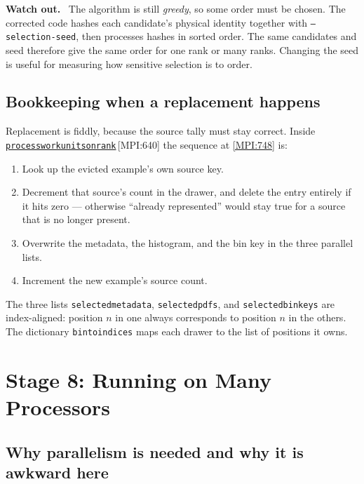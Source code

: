 \documentclass[11pt,a4paper]{report}
\newcommand{\srcbase}{vscode://file/Users/syellapa/Documents/Research/2026/ANSYS/Multi-ScalarPDF}
\newcommand{\srctag}[1]{{\footnotesize\textcolor{TagGray}{[#1]}}}
\newcommand{\Mpi}[2]{\href{\srcbase/EnsightPDFHybridDatasetMPI.py:#1}{\texttt{#2}}\,\srctag{MPI:#1}}
\newcommand{\MpiL}[1]{\href{\srcbase/EnsightPDFHybridDatasetMPI.py:#1}{\srctag{MPI:#1}}}
\newcommand{\code}[1]{\texttt{#1}}
\renewcommand{\_}{\origtextunderscore\allowbreak}
\newlength{\calloutwidth}
\newcommand{\calloutOpen}{%
  \par\medskip\noindent
  \setlength{\calloutwidth}{\dimexpr\linewidth-2\fboxsep\relax}%
  \begin{lrbox}{\calloutbox}\begin{minipage}{\calloutwidth}}
\newcommand{\calloutClose}[1]{%
  \end{minipage}\end{lrbox}\colorbox{#1}{\usebox{\calloutbox}}\par\medskip}
\newenvironment{caution}
  {\calloutOpen\textbf{Watch out.}\ }
  {\calloutClose{WarnBG}}
\begin{document}
\begin{caution}
The algorithm is still \emph{greedy}, so some order must be chosen.  The corrected code hashes
each candidate's physical identity together with \code{--selection-seed}, then processes hashes
in sorted order.  The same candidates and seed therefore give the same order for one rank or
many ranks.  Changing the seed is useful for measuring how sensitive selection is to order.
\end{caution}

\section{Bookkeeping when a replacement happens}

Replacement is fiddly, because the source tally must stay correct. Inside
\Mpi{640}{process\_work\_units\_on\_rank} the sequence at \MpiL{748} is:

\begin{enumerate}
  \item Look up the evicted example's own source key.
  \item Decrement that source's count in the drawer, and delete the entry entirely if it
        hits zero --- otherwise ``already represented'' would stay true for a source that is
        no longer present.
  \item Overwrite the metadata, the histogram, and the bin key in the three parallel lists.
  \item Increment the new example's source count.
\end{enumerate}

The three lists \code{selected\_metadata}, \code{selected\_pdfs}, and
\code{selected\_bin\_keys} are index-aligned: position $n$ in one always corresponds to
position $n$ in the others. The dictionary \code{bin\_to\_indices} maps each drawer to the
list of positions it owns.

\chapter{Stage 8: Running on Many Processors}
\label{ch:mpi}

\section{Why parallelism is needed and why it is awkward here}
\end{document}
